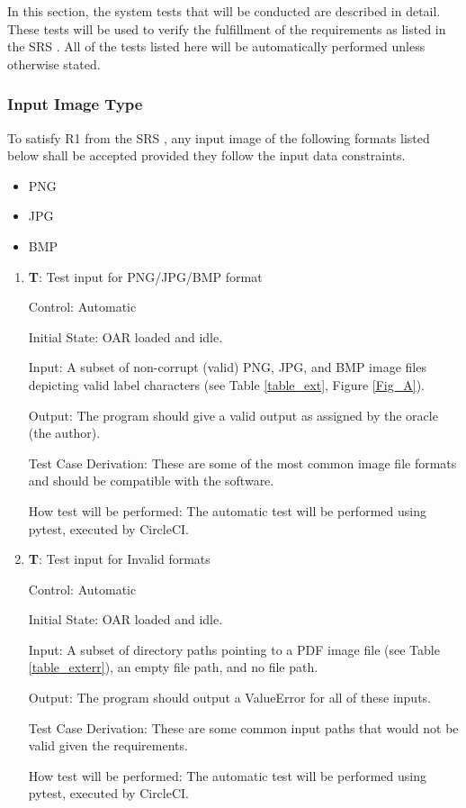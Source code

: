 \documentclass[12pt, titlepage]{article}
\newcounter{testnum} %
\begin{document}
In this section, the system tests that will be conducted are described in detail. These tests
will be used to verify the fulfillment of the requirements as listed in the SRS \citep{SRS}.
All of the tests listed here will be automatically performed unless otherwise stated.

\subsubsection{Input Image Type}

To satisfy R1 from the SRS \citep{SRS}, any input image of the following formats listed below shall be 
accepted provided they follow the input data constraints.

\begin{itemize}
  \item{PNG}
  \item{JPG}
  \item{BMP\\}
\end{itemize}

\begin{enumerate}

  \item{\textbf{T\thetestnum \label{T_inputImage}}: Test input for PNG/JPG/BMP format\\}
            
  Control: Automatic
            
  Initial State: OAR loaded and idle.
            
  Input: A subset of non-corrupt (valid) PNG, JPG, and BMP image files depicting valid label characters (see Table \ref{table_ext}, Figure \ref{Fig_A}).
            
  Output: The program should give a valid output as assigned by the oracle (the author).
            
  Test Case Derivation: These are some of the most common image file formats and should be compatible with the software.
            
  How test will be performed: The automatic test will be performed using pytest, executed by CircleCI.

  \item{\textbf{T\thetestnum \label{T_inputError}}: Test input for Invalid formats\\}
            
  Control: Automatic
            
  Initial State: OAR loaded and idle.
            
  Input: A subset of directory paths pointing to a PDF image file (see Table \ref{table_exterr}), an empty file path, and no file path.
            
  Output: The program should output a ValueError for all of these inputs.
            
  Test Case Derivation: These are some common input paths that would not be valid given the requirements.
            
  How test will be performed: The automatic test will be performed using pytest, executed by CircleCI.
\end{enumerate}
\end{document}
